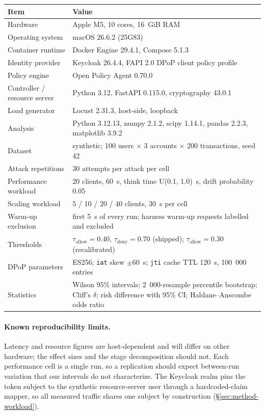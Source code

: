 \begin{table}[h]
\centering
\small
\begin{tabular}{p{3.1cm}p{4.5cm}}
\toprule
Item & Value \\
\midrule
Hardware & Apple M5, 10 cores, 16~GiB RAM \\
Operating system & macOS 26.6.2 (25G83) \\
Container runtime & Docker Engine 29.4.1, Compose 5.1.3 \\
Identity provider & Keycloak 26.4.4, FAPI 2.0 DPoP client policy profile \\
Policy engine & Open Policy Agent 0.70.0 \\
Controller / resource server & Python 3.12, FastAPI 0.115.0, cryptography 43.0.1 \\
Load generator & Locust 2.31.3, host-side, loopback \\
Analysis & Python 3.12.13, numpy 2.1.2, scipy 1.14.1, pandas 2.2.3, matplotlib 3.9.2 \\
Dataset & synthetic; 100 users $\times$ 3 accounts $\times$ 200 transactions, seed 42 \\
Attack repetitions & 30 attempts per attack per cell \\
Performance workload & 20 clients, 60~s, think time U(0.1, 1.0)~s, drift probability 0.05 \\
Scaling workload & 5 / 10 / 20 / 40 clients, 30~s per cell \\
Warm-up exclusion & first 5~s of every run; harness warm-up requests labelled and excluded \\
Thresholds & $\tau_{\mathrm{allow}} = 0.40$, $\tau_{\mathrm{deny}} = 0.70$ (shipped); $\tau_{\mathrm{allow}} = 0.30$ (recalibrated) \\
DPoP parameters & ES256; \texttt{iat} skew $\pm$60~s; \texttt{jti} cache TTL 120~s, 100~000 entries \\
Statistics & Wilson 95\% intervals; 2~000-resample percentile bootstrap; Cliff's $\delta$; risk difference with 95\% CI; Haldane--Anscombe odds ratio \\
\bottomrule
\end{tabular}
\end{table}

\paragraph{Known reproducibility limits.} Latency and resource figures are host-dependent and will differ on other hardware; the effect sizes and the stage decomposition should not. Each performance cell is a single run, so a replication should expect between-run variation that our intervals do not characterize. The Keycloak realm pins the token subject to the synthetic resource-server user through a hardcoded-claim mapper, so all measured traffic shares one subject by construction (\S\ref{sec:method-workload}).

